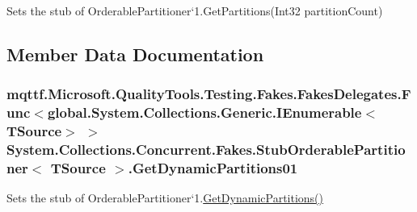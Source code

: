 Sets the stub of Orderable\-Partitioner`1.Get\-Partitions(\-Int32 partition\-Count)



\subsection{Member Data Documentation}
\hypertarget{class_system_1_1_collections_1_1_concurrent_1_1_fakes_1_1_stub_orderable_partitioner_3_01_t_source_01_4_acf3d8953f63bb2632d2697b1f26e7ca4}{
\subsubsection[{Get\-Dynamic\-Partitions01}]{\setlength{\rightskip}{0pt plus 5cm}mqttf.\-Microsoft.\-Quality\-Tools.\-Testing.\-Fakes.\-Fakes\-Delegates.\-Func$<$global.\-System.\-Collections.\-Generic.\-I\-Enumerable$<$T\-Source$>$ $>$ System.\-Collections.\-Concurrent.\-Fakes.\-Stub\-Orderable\-Partitioner$<$ T\-Source $>$.Get\-Dynamic\-Partitions01}}\label{class_system_1_1_collections_1_1_concurrent_1_1_fakes_1_1_stub_orderable_partitioner_3_01_t_source_01_4_acf3d8953f63bb2632d2697b1f26e7ca4}


Sets the stub of Orderable\-Partitioner`1.\hyperlink{class_system_1_1_collections_1_1_concurrent_1_1_fakes_1_1_stub_orderable_partitioner_3_01_t_source_01_4_a5bf081b6944021eb3f37783d45302a69}{Get\-Dynamic\-Partitions()}

